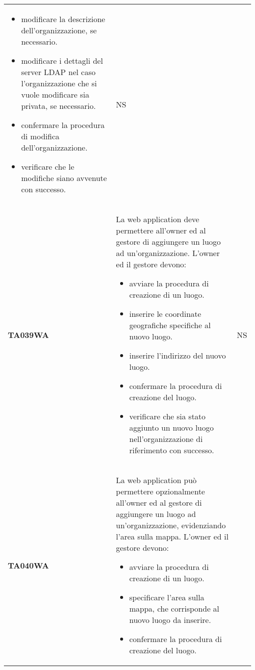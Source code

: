\documentclass[../../piano-di-qualifica.tex]{subfiles}
\begin{document}
\begin{longtable}[H]{>{\centering\bfseries}m{3cm} >{}m{10cm} >{\centering\arraybackslash}m{3cm}}
\begin{itemize}
    \item modificare la descrizione dell'organizzazione, se necessario.
    \item modificare i dettagli del server LDAP nel caso l'organizzazione che si vuole modificare sia privata, se necessario.
    \item confermare la procedura di modifica dell'organizzazione.
    \item verificare che le modifiche siano avvenute con successo.
  \end{itemize}
                    & NS                                                                                                                                                                                                                                                               \\
  TA039WA           & La web application deve permettere all'owner ed al gestore di aggiungere un luogo ad un'organizzazione. \newline
  L'owner ed il gestore devono:
  \begin{itemize}
    \item avviare la procedura di creazione di un luogo.
    \item inserire le coordinate geografiche specifiche al nuovo luogo.
    \item inserire l'indirizzo del nuovo luogo.
    \item confermare la procedura di creazione del luogo.
    \item verificare che sia stato aggiunto un nuovo luogo nell'organizzazione di riferimento con successo.
  \end{itemize}
                    & NS                                                                                                                                                                                                                                                               \\
  TA040WA           & La web application può permettere opzionalmente all'owner ed al gestore di aggiungere un luogo ad un'organizzazione, evidenziando l'area sulla mappa. \newline
  L'owner ed il gestore devono:
  \begin{itemize}
    \item avviare la procedura di creazione di un luogo.
    \item specificare l'area sulla mappa, che corrisponde al nuovo luogo da inserire.
    \item confermare la procedura di creazione del luogo.

\end{itemize}
\end{longtable}
\end{document}
